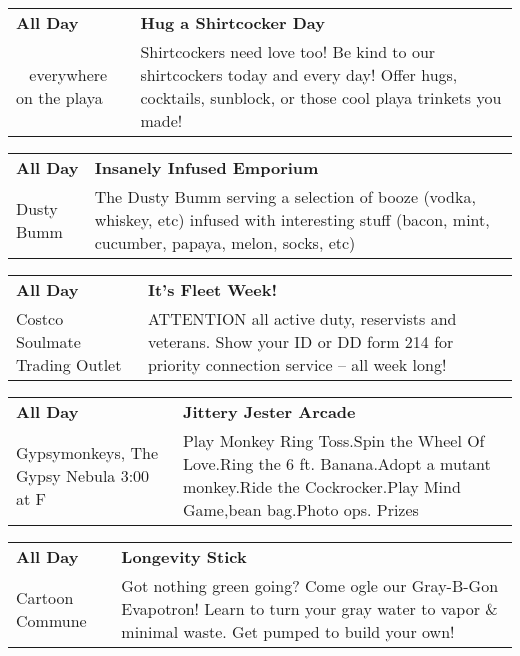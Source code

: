 \begin{tabular}{ p{1in} p{2.2in} }
    \textbf{All Day} & \textbf{Hug a Shirtcocker Day} \\
    ~ \newline everywhere on the playa & Shirtcockers need love too! Be kind to our shirtcockers today and every day! Offer hugs, cocktails, sunblock, or those cool playa trinkets you made! \\
    \hline 
\end{tabular}
    
\begin{tabular}{ p{1in} p{2.2in} }
    \textbf{All Day} & \textbf{Insanely Infused Emporium} \\
    Dusty Bumm \newline  & The Dusty Bumm serving a selection of booze (vodka, whiskey, etc) infused with interesting stuff (bacon, mint, cucumber, papaya, melon, socks, etc) \\
    \hline 
\end{tabular}
    
\begin{tabular}{ p{1in} p{2.2in} }
    \textbf{All Day} & \textbf{It's Fleet Week!} \\
    Costco Soulmate Trading Outlet \newline  & ATTENTION all active duty, reservists and veterans. Show your ID or DD form 214 for priority connection service -- all week long! \\
    \hline 
\end{tabular}
    
\begin{tabular}{ p{1in} p{2.2in} }
    \textbf{All Day} & \textbf{Jittery Jester Arcade} \\
    Gypsymonkeys, The \newline Gypsy Nebula  3:00 at F & Play Monkey Ring Toss.Spin the Wheel Of Love.Ring the 6 ft. Banana.Adopt a mutant monkey.Ride the Cockrocker.Play Mind Game,bean bag.Photo ops. Prizes \\
    \hline 
\end{tabular}
    
\begin{tabular}{ p{1in} p{2.2in} }
    \textbf{All Day} & \textbf{Longevity Stick} \\
    Cartoon Commune \newline  & Got nothing green going? Come ogle our Gray-B-Gon Evapotron! Learn to turn your gray water to vapor \& minimal waste. Get pumped to build your own! \\
    \hline 
\end{tabular}
    
